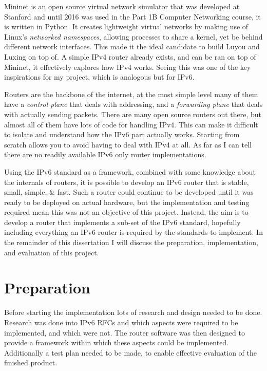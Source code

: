 \documentclass[12pt,a4paper,twoside,openright]{report}
\begin{document}
\bigskip

Mininet\cite{mininet} is an open source virtual network simulator that was developed at Stanford and until 2016 was used in the Part 1B Computer Networking course, it is written in Python.  It creates lightweight virtual networks by making use of Linux's \textit{networked namespaces}, allowing processes to share a kernel, yet be behind different network interfaces. This made it the ideal candidate to build Luyou and Luxing on top of. A simple IPv4 router\cite{simple_router} already exists, and can be ran on top of Mininet, it effectively explores how IPv4 works.  Seeing this was one of the key inspirations for my project, which is analogous but for IPv6.

\bigskip

Routers are the backbone of the internet, at the most simple level many of them have a \textit{control plane} that deals with addressing, and a \textit{forwarding plane} that deals with actually sending packets. There are many open source routers out there, but almost all of them have lots of code for handling IPv4. This can make it difficult to isolate and understand how the IPv6 part actually works.  Starting from scratch allows you to avoid having to deal with IPv4 at all.  As far as I can tell there are no readily available IPv6 only router implementations.

\bigskip

Using the IPv6 standard as a framework, combined with some knowledge about the internals of routers, it is possible to develop an IPv6 router that is stable, small, simple, \& fast.  Such a router could continue to be developed until it was ready to be deployed on actual hardware, but the implementation and testing required mean this was not an objective of this project.  Instead, the aim is to develop a router that implements a sub-set of the IPv6 standard, hopefully including everything an IPv6 router is required by the standards to implement.  In the remainder of this dissertation I will discuss the preparation, implementation, and evaluation of this project.

\chapter{Preparation}
\label{chap::preperation}

Before starting the implementation lots of research and design needed to be done. Research was done into IPv6 RFCs\cite{ipv6_rfc} and which aspects were required to be implemented, and which were not. The router software was then designed to provide a framework within which these aspects could be implemented.  Additionally a test plan needed to be made, to enable effective evaluation of the finished product.
\end{document}
